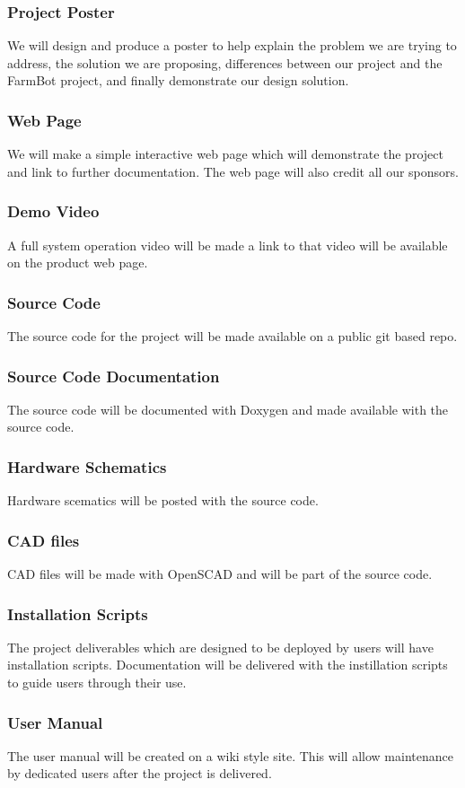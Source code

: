 \subsubsection{Project Poster}
We will design and produce a poster to help explain the problem we are trying to address, the solution we are proposing, differences between our project and the FarmBot project, and finally demonstrate our design solution.

\subsubsection{Web Page}
We will make a simple interactive web page which will demonstrate the project and link to further documentation. The web page will also credit all our sponsors.

\subsubsection{Demo Video}
A full system operation video will be made a link to that video will be available on the product web page.

\subsubsection{Source Code}
The source code for the project will be made available on a public git based repo.

\subsubsection{Source Code Documentation}
The source code will be documented with Doxygen and made available with the source code.

\subsubsection{Hardware Schematics}
Hardware scematics will be posted with the source code.

\subsubsection{CAD files}
CAD files will be made with OpenSCAD and will be part of the source code.

\subsubsection{Installation Scripts}
The project deliverables which are designed to be deployed by users will have installation scripts. Documentation will be delivered with the instillation scripts to guide users through their use.

\subsubsection{User Manual}
The user manual will be created on a wiki style site. This will allow maintenance by dedicated users after the project is delivered.